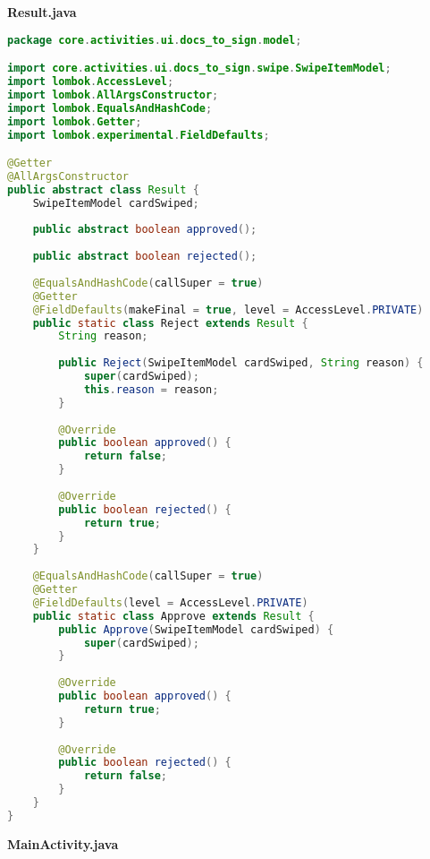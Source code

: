\textbf{Result.java}
\begin{lstlisting}[language=Java]
package core.activities.ui.docs_to_sign.model;

import core.activities.ui.docs_to_sign.swipe.SwipeItemModel;
import lombok.AccessLevel;
import lombok.AllArgsConstructor;
import lombok.EqualsAndHashCode;
import lombok.Getter;
import lombok.experimental.FieldDefaults;

@Getter
@AllArgsConstructor
public abstract class Result {
	SwipeItemModel cardSwiped;
	
	public abstract boolean approved();
	
	public abstract boolean rejected();
	
	@EqualsAndHashCode(callSuper = true)
	@Getter
	@FieldDefaults(makeFinal = true, level = AccessLevel.PRIVATE)
	public static class Reject extends Result {
		String reason;
		
		public Reject(SwipeItemModel cardSwiped, String reason) {
			super(cardSwiped);
			this.reason = reason;
		}
		
		@Override
		public boolean approved() {
			return false;
		}
		
		@Override
		public boolean rejected() {
			return true;
		}
	}
	
	@EqualsAndHashCode(callSuper = true)
	@Getter
	@FieldDefaults(level = AccessLevel.PRIVATE)
	public static class Approve extends Result {
		public Approve(SwipeItemModel cardSwiped) {
			super(cardSwiped);
		}
		
		@Override
		public boolean approved() {
			return true;
		}
		
		@Override
		public boolean rejected() {
			return false;
		}
	}
}

\end{lstlisting}
\textbf{MainActivity.java}
